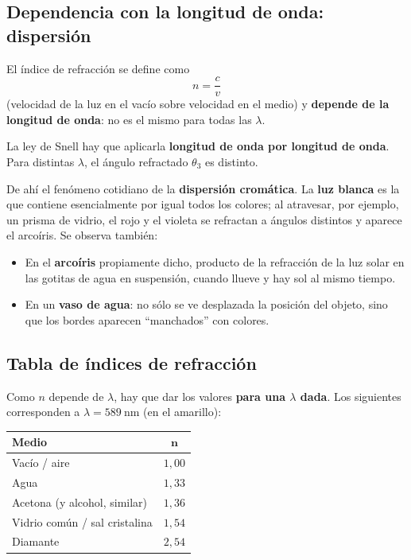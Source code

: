 \documentclass[12pt,a4paper]{article}
\begin{document}
\subsection{Dependencia con la longitud de onda: dispersión}

El índice de refracción se define como
\[
n = \frac{c}{v}
\]
(velocidad de la luz en el vacío sobre velocidad en el medio) y \textbf{depende
de la longitud de onda}: no es el mismo para todas las $\lambda$.

\begin{warnbox}[Consecuencia]
La ley de Snell hay que aplicarla \textbf{longitud de onda por longitud de
onda}. Para distintas $\lambda$, el ángulo refractado $\theta_3$ es distinto.
\end{warnbox}

De ahí el fenómeno cotidiano de la \textbf{dispersión cromática}. La \textbf{luz
blanca} es la que contiene esencialmente por igual todos los colores; al
atravesar, por ejemplo, un prisma de vidrio, el rojo y el violeta se refractan a
ángulos distintos y aparece el arcoíris. Se observa también:

\begin{itemize}
  \item En el \textbf{arcoíris} propiamente dicho, producto de la refracción de
        la luz solar en las gotitas de agua en suspensión, cuando llueve y hay
        sol al mismo tiempo.
  \item En un \textbf{vaso de agua}: no sólo se ve desplazada la posición del
        objeto, sino que los bordes aparecen \enquote{manchados} con colores.
\end{itemize}



\subsection{Tabla de índices de refracción}

Como $n$ depende de $\lambda$, hay que dar los valores \textbf{para una $\lambda$
dada}. Los siguientes corresponden a $\lambda = \SI{589}{\nano\metre}$ (en el
amarillo):

\begin{table}[H]
\centering
\begin{tabular}{lc}
\toprule
\textbf{Medio} & $\mathbf{n}$ \\
\midrule
Vacío / aire                  & $1{,}00$ \\
Agua                          & $1{,}33$ \\
Acetona (y alcohol, similar)  & $1{,}36$ \\
Vidrio común / sal cristalina & $1{,}54$ \\
Diamante                      & $2{,}54$ \\
\bottomrule
\end{tabular}
\end{table}
\end{document}
